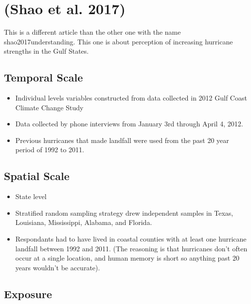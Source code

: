 \documentclass[
]{article}
\providecommand{\tightlist}{%
  \setlength{\itemsep}{0pt}\setlength{\parskip}{0pt}}
\begin{document}
\hypertarget{shao2017understanding-1}{%
\section{(Shao et al. 2017)}\label{shao2017understanding-1}}

This is a different article than the other one with the name
shao2017understanding. This one is about perception of increasing
hurricane strengths in the Gulf States.

\hypertarget{temporal-scale-29}{%
\subsection{Temporal Scale}\label{temporal-scale-29}}

\begin{itemize}
\tightlist
\item
  Individual levels variables constructed from data collected in 2012
  Gulf Coast Climate Change Study
\item
  Data collected by phone interviews from January 3rd through April 4,
  2012.
\item
  Previous hurricanes that made landfall were used from the past 20 year
  period of 1992 to 2011.
\end{itemize}

\hypertarget{spatial-scale-29}{%
\subsection{Spatial Scale}\label{spatial-scale-29}}

\begin{itemize}
\tightlist
\item
  State level
\item
  Stratified random sampling strategy drew independent samples in Texas,
  Louisiana, Mississippi, Alabama, and Florida.
\item
  Respondants had to have lived in coastal counties with at least one
  hurricane landfall between 1992 and 2011. (The reasoning is that
  hurricanes don't often occur at a single location, and human memory is
  short so anything past 20 years wouldn't be accurate).
\end{itemize}

\hypertarget{exposure-28}{%
\subsection{Exposure}\label{exposure-28}}
\end{document}
